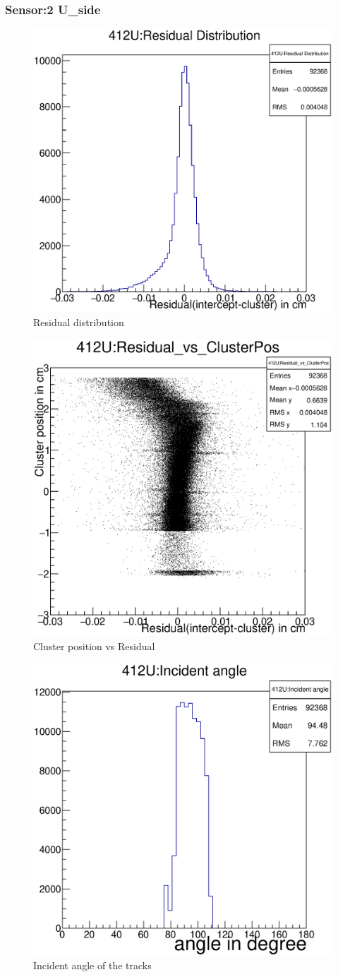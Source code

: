 \documentclass[12pt]{article}
\begin{document}
		\subsubsection{Sensor:2 U\_side}
		\begin{multicols}{3}
			
			\begin{figure}[H]
				\includegraphics[width=.3\textwidth]{412U:residualplot.eps}	
				\caption{Residual distribution}	
				\label{fig1}	
			\end{figure}
			\begin{figure}[H]
				\includegraphics[width=.3\textwidth]{412U:residual_vs_clusterpos.eps}	
				\caption{Cluster position vs Residual}	
				\label{fig2}	
			\end{figure}
			\begin{figure}[H]
				\includegraphics[width=.3\textwidth]{412U:incident_angle.eps}	
				\caption{Incident angle of the tracks}	
				\label{fig2}	
			\end{figure}
		\end{multicols}
		
\end{document}
